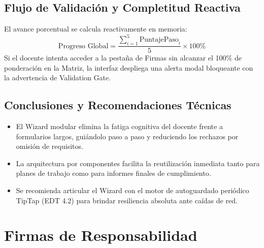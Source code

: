\documentclass[12pt,a4paper]{article}
\begin{document}
\subsection{Flujo de Validación y Completitud Reactiva}
El avance porcentual se calcula reactivamente en memoria:
\begin{equation}
\text{Progreso Global} = \frac{\sum_{i=1}^{5} \text{PuntajePaso}_i}{5} \times 100\%
\end{equation}
Si el docente intenta acceder a la pestaña de Firmas sin alcanzar el 100\% de ponderación en la Matriz, la interfaz despliega una alerta modal bloqueante con la advertencia de Validation Gate.

\subsection{Conclusiones y Recomendaciones Técnicas}
\begin{itemize}[leftmargin=1.5em, itemsep=2pt]
    \item El Wizard modular elimina la fatiga cognitiva del docente frente a formularios largos, guiándolo paso a paso y reduciendo los rechazos por omisión de requisitos.
    \item La arquitectura por componentes facilita la reutilización inmediata tanto para planes de trabajo como para informes finales de cumplimiento.
    \item Se recomienda articular el Wizard con el motor de autoguardado periódico TipTap (EDT 4.2) para brindar resiliencia absoluta ante caídas de red.
\end{itemize}

\vspace{0.3cm}

\section{Firmas de Responsabilidad}
\end{document}

